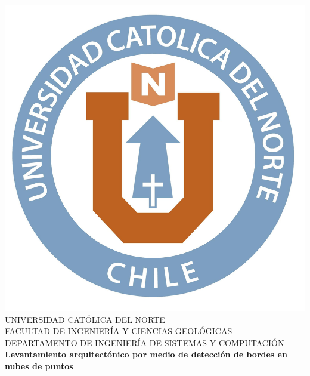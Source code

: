 \documentclass[oneside,12pt, letterpaper, titlepage]{book}
\begin{document}
\sloppy %

\renewcommand{\figurename}{FIGURA}
\renewcommand{\tablename}{TABLA}
\renewcommand{\listtablename}{ÍNDICE DE TABLAS}
\renewcommand{\listfigurename}{ÍNDICE DE FIGURAS}

\setlength{\parindent}{1pt}
\setlength{\parskip}{\baselineskip} 
\onehalfspace


\begin{titlepage}
\centering
\vspace*{-0.4in}
\includegraphics[scale=0.3]{./images/u.jpg}\\
{\fontsize{14}{14}\selectfont
UNIVERSIDAD CATÓLICA DEL NORTE\\
FACULTAD DE INGENIERÍA Y CIENCIAS GEOLÓGICAS\\
DEPARTAMENTO DE INGENIERÍA DE SISTEMAS Y COMPUTACIÓN\\}
\vspace{2.3in}
{\fontsize{18}{18}\bfseries Levantamiento arquitectónico por medio de detección de bordes en nubes de puntos}


\end{titlepage}
\end{document}
